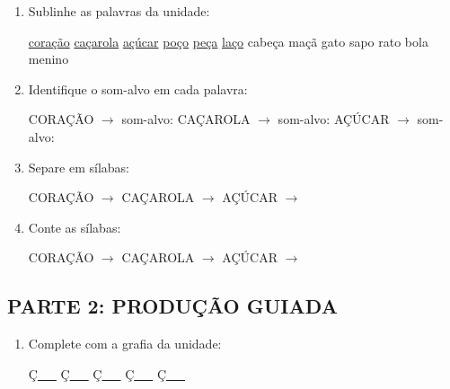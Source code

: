 \begin{exercicio}
\begin{enumerate}
  \item Sublinhe as palavras da unidade:

\begin{center}
  \uline{coração} \quad \uline{caçarola} \quad \uline{açúcar} \quad \uline{poço} \quad \uline{peça} \quad \uline{laço} \quad cabeça \quad maçã \quad gato \quad sapo \quad rato \quad bola \quad menino
\end{center}

  \item Identifique o som-alvo em cada palavra:
  \begin{center}
  CORAÇÃO $\rightarrow$ som-alvo: \underline{\hspace{1cm}} \quad CAÇAROLA $\rightarrow$ som-alvo: \underline{\hspace{1cm}} \quad AÇÚCAR $\rightarrow$ som-alvo: \underline{\hspace{1cm}}
  \end{center}

  \item Separe em sílabas:
  \begin{center}
  CORAÇÃO $\rightarrow$ \underline{\hspace{1cm}} \quad CAÇAROLA $\rightarrow$ \underline{\hspace{1cm}} \quad AÇÚCAR $\rightarrow$ \underline{\hspace{1cm}}
  \end{center}

  \item Conte as sílabas:
  \begin{center}
  CORAÇÃO $\rightarrow$ \underline{\hspace{0.9cm}} \quad CAÇAROLA $\rightarrow$ \underline{\hspace{0.9cm}} \quad AÇÚCAR $\rightarrow$ \underline{\hspace{0.9cm}}
  \end{center}

\end{enumerate}

\subsection*{PARTE 2: PRODUÇÃO GUIADA}

\begin{enumerate}[resume]

  \item Complete com a grafia da unidade:
  \begin{center}
  Ç\underline{~~~} \quad Ç\underline{~~~} \quad Ç\underline{~~~} \quad Ç\underline{~~~} \quad Ç\underline{~~~}
  \end{center}


\end{enumerate}
\end{exercicio}
